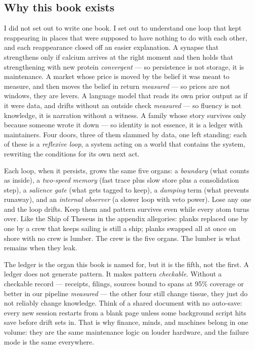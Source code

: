 \subsection*{Why this book exists}

I did not set out to write one book. I set out to understand one loop that kept reappearing in places that were supposed to have nothing to do with each other, and each reappearance closed off an easier explanation. A synapse that strengthens only if calcium arrives at the right moment and then holds that strengthening with new protein \textit{convergent} \citep{kandel2000} --- so persistence is not storage, it is maintenance. A market whose price is moved by the belief it was meant to measure, and then moves the belief in return \textit{measured} \citep{soros} --- so prices are not windows, they are levers. A language model that reads its own prior output as if it were data, and drifts without an outside check \textit{measured} \citep{panickssery2024,shumailov2024} --- so fluency is not knowledge, it is narration without a witness. A family whose story survives only because someone wrote it down --- so identity is not essence, it is a ledger with maintainers. Four doors, three of them slammed by data, one left standing: each of these is a \textit{reflexive loop}, a system acting on a world that contains the system, rewriting the conditions for its own next act.

Each loop, when it persists, grows the same five organs: a \textit{boundary} (what counts as inside), a \textit{two-speed memory} (fast trace plus slow store plus a consolidation step), a \textit{salience gate} (what gets tagged to keep), a \textit{damping} term (what prevents runaway), and an \textit{internal observer} (a slower loop with veto power). Lose any one and the loop drifts. Keep them and pattern survives even while every atom turns over. Like the Ship of Theseus in the appendix allegories: planks replaced one by one by a crew that keeps sailing is still a ship; planks swapped all at once on shore with no crew is lumber. The crew is the five organs. The lumber is what remains when they leak.

The ledger is the organ this book is named for, but it is the fifth, not the first. A ledger does not generate pattern. It makes pattern \textit{checkable}. Without a checkable record --- receipts, filings, sources bound to spans at 95\% coverage or better in our pipeline \textit{measured} --- the other four still change tissue, they just do not reliably change knowledge. Think of a shared document with no auto-save: every new session restarts from a blank page unless some background script hits save before drift sets in. That is why finance, minds, and machines belong in one volume: they are the same maintenance logic on louder hardware, and the failure mode is the same everywhere.

